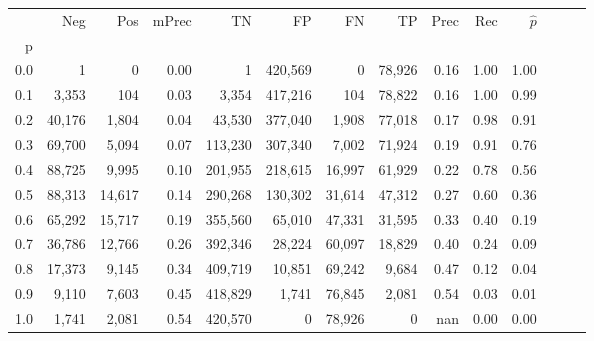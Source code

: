 \begin{tabular}{rrrrrrrrrrrrrr}
\toprule
{} &     Neg &     Pos & mPrec &       TN &       FP &      FN &      TP &  Prec &   Rec & $\hat{p}$ \\
p   &         &         &       &          &          &         &         &       &       &           \\
\midrule
0.0 &       1 &       0 &  0.00 &        1 &  420,569 &       0 &  78,926 &  0.16 &  1.00 &      1.00 \\
0.1 &   3,353 &     104 &  0.03 &    3,354 &  417,216 &     104 &  78,822 &  0.16 &  1.00 &      0.99 \\
0.2 &  40,176 &   1,804 &  0.04 &   43,530 &  377,040 &   1,908 &  77,018 &  0.17 &  0.98 &      0.91 \\
0.3 &  69,700 &   5,094 &  0.07 &  113,230 &  307,340 &   7,002 &  71,924 &  0.19 &  0.91 &      0.76 \\
0.4 &  88,725 &   9,995 &  0.10 &  201,955 &  218,615 &  16,997 &  61,929 &  0.22 &  0.78 &      0.56 \\
0.5 &  88,313 &  14,617 &  0.14 &  290,268 &  130,302 &  31,614 &  47,312 &  0.27 &  0.60 &      0.36 \\
0.6 &  65,292 &  15,717 &  0.19 &  355,560 &   65,010 &  47,331 &  31,595 &  0.33 &  0.40 &      0.19 \\
0.7 &  36,786 &  12,766 &  0.26 &  392,346 &   28,224 &  60,097 &  18,829 &  0.40 &  0.24 &      0.09 \\
0.8 &  17,373 &   9,145 &  0.34 &  409,719 &   10,851 &  69,242 &   9,684 &  0.47 &  0.12 &      0.04 \\
0.9 &   9,110 &   7,603 &  0.45 &  418,829 &    1,741 &  76,845 &   2,081 &  0.54 &  0.03 &      0.01 \\
1.0 &   1,741 &   2,081 &  0.54 &  420,570 &        0 &  78,926 &       0 &   nan &  0.00 &      0.00 \\
\bottomrule
\end{tabular}
